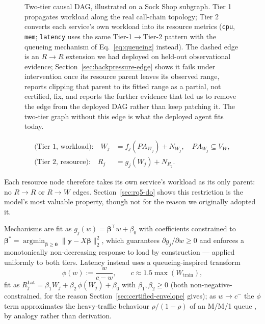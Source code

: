 \documentclass[journal, 10pt]{IEEEtran}
\begin{document}
\begin{figure}[t]
{%
}
\caption{Two-tier causal DAG, illustrated on a Sock Shop subgraph. Tier 1 propagates workload along the real call-chain topology; Tier 2 converts each service's own workload into its resource metrics (\texttt{cpu}, \texttt{mem}; \texttt{latency} uses the same Tier-1$\to$Tier-2 pattern with the queueing mechanism of Eq.~\eqref{eq:queueing} instead). The dashed edge is an $R\to R$ extension we had deployed on held-out observational evidence; Section~\ref{sec:backpressure-edge} shows it fails under intervention once its resource parent leaves its observed range, reports clipping that parent to its fitted range as a partial, not certified, fix, and reports the further evidence that led us to remove the edge from the deployed DAG rather than keep patching it. The two-tier graph without this edge is what the deployed agent fits today.}
\label{fig:dag}
\end{figure}

\begin{equation}
\begin{aligned}
\text{(Tier 1, workload):}\quad W_j &= f_j(PA_{W_j}) + N_{W_j}, \quad PA_{W_j} \subseteq V_W, \\
\text{(Tier 2, resource):}\quad R_j &= g_j(W_j) + N_{R_j}.
\end{aligned}
\label{eq:tiers}
\end{equation}

Each resource node therefore takes its own service's workload as its only parent:
no $R \to R$ or $R \to W$ edges. Section~\ref{sec:rq5-do} shows this restriction
is the model's most valuable property, though not for the reason we originally
adopted it.

Mechanisms are fit as $g_j(w) = \boldsymbol{\beta}^\top w + \beta_0$ with
coefficients constrained to
$\boldsymbol{\beta}^* = \operatorname*{argmin}_{\boldsymbol{\beta}\geq\mathbf{0}}
\lVert \mathbf{y} - X\boldsymbol{\beta}\rVert_2^2$, which guarantees
$\partial g_j/\partial w \geq 0$ and enforces a monotonically non-decreasing
response to load by construction --- applied uniformly to both tiers. Latency
instead uses a queueing-inspired transform
\begin{equation}
\phi(w) := \frac{w}{c-w}, \qquad c \approx 1.5 \max(W_{\text{train}}),
\label{eq:queueing}
\end{equation}
fit as $R^{\text{Lat}}_j = \beta_1 W_j + \beta_2\,\phi(W_j) + \beta_0$ with
$\beta_1,\beta_2\geq 0$ (both non-negative-constrained, for the reason
Section~\ref{sec:certified-envelope} gives); as $w \to c^-$ the $\phi$ term
approximates the heavy-traffic behaviour $\rho/(1-\rho)$ of an M/M/1 queue
\cite{kingman1961}, by analogy rather than derivation.
\end{document}
